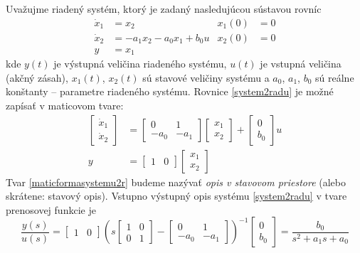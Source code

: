 \documentclass[a4paper, 10pt, ]{article}
\begin{document}
Uvažujme riadený systém, ktorý je zadaný nasledujúcou sústavou rovníc
\begin{subequations} \label{system2radu}
\begin{align}
    \dot x_1 &= x_2  &  x_1(0)&=0 \\
    \dot x_2 &= -a_1 x_2 - a_0 x_1 + b_0 u &  x_2(0)&=0 \\
    y &= x_1
\end{align}
\end{subequations}
kde $y(t)$ je výstupná veličina riadeného systému, $u(t)$ je vstupná veličina (akčný zásah), $x_1(t)$, $x_2(t)$ sú stavové veličiny systému a $a_0$, $a_1$, $b_0$ sú reálne konštanty -- parametre riadeného systému. Rovnice \eqref{system2radu} je možné zapísať v maticovom tvare:
\begin{subequations} \label{maticformasystemu2r}
    \begin{align}
        \begin{bmatrix} \dot x_1  \\ \dot x_2 \end{bmatrix}
         &=
         \begin{bmatrix} 0 & 1 \\ -a_0 & -a_1 \end{bmatrix}
         \begin{bmatrix} x_1 \\ x_2 \end{bmatrix}
         +
         \begin{bmatrix} 0 \\ b_0 \end{bmatrix}
         u \\
         y &= \begin{bmatrix} 1 & 0 \end{bmatrix}
         \begin{bmatrix} x_1 \\ x_2 \end{bmatrix}
    \end{align}
\end{subequations}
Tvar \eqref{maticformasystemu2r} budeme nazývať \emph{opis v stavovom priestore} (alebo skrátene: stavový opis). Vstupno výstupný opis systému \eqref{system2radu} v tvare prenosovej funkcie je
\begin{equation} \label{k01:eq:02}
    \frac{y(s)}{u(s)}
    =
    \begin{bmatrix} 1 & 0 \end{bmatrix}
     \left(
         s \begin{bmatrix} 1 & 0 \\ 0 & 1 \end{bmatrix}
         -
         \begin{bmatrix} 0 & 1 \\ -a_0 & -a_1 \end{bmatrix}
     \right)^{-1}
     \begin{bmatrix} 0 \\ b_0 \end{bmatrix}
     =
     \frac{b_0}{s^2 + a_1 s + a_0}
\end{equation}
\end{document}

